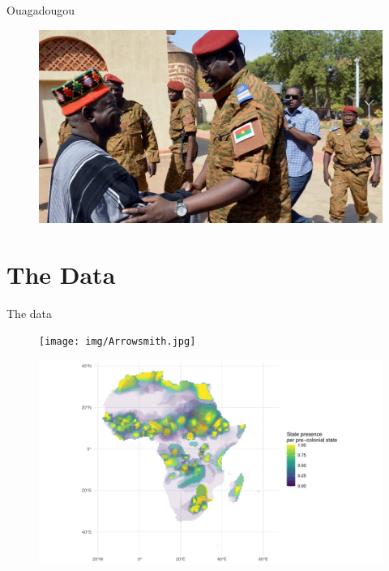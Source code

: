 \documentclass{beamer}
\begin{document}
\begin{frame} Ouagadougou
	\begin{figure}
		\includegraphics[width=\linewidth]{img/moghonaba.jpg}
	\end{figure}
\end{frame}

\section{The Data}

\begin{frame}
	\centering
	\Large The data
\end{frame}

\begin{frame}{}
	\begin{figure}
		\texttt{[image: img/Arrowsmith.jpg]}
	\end{figure}
\end{frame}	

\begin{frame} %

	\begin{figure}
		\includegraphics[width=\linewidth]{img/geo_isd_all.pdf}
	\end{figure}

\end{frame}
\end{document}
